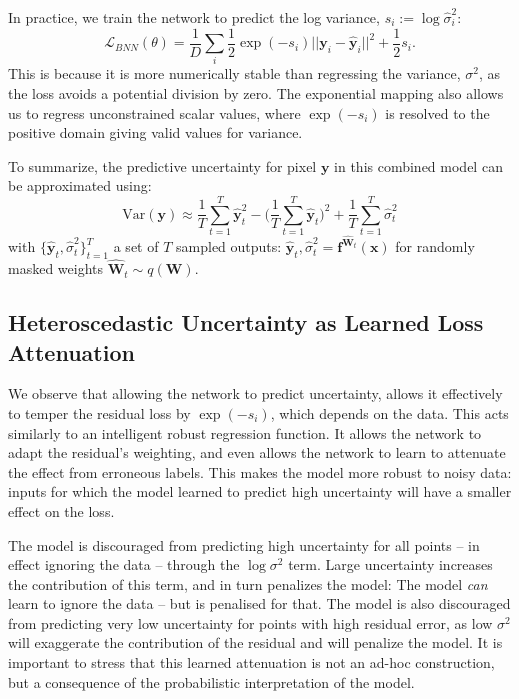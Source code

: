 \documentclass{article}
\newcommand{\cL}{\mathcal{L}}
\newcommand{\f}{\mathbf{f}}
\newcommand{\x}{\mathbf{x}}
\newcommand{\y}{\mathbf{y}}
\newcommand{\W}{\mathbf{W}}
\newcommand{\Wh}{{\widehat{\mathbf{W}}}}
\begin{document}
In practice, we train the network to predict the log variance, $s_i := \log \hat{\sigma}_i^2$: 
\begin{equation}
\cL_{BNN}(\theta) = \frac{1}{D} \sum_i \frac{1}{2} \exp (-s_i) ||\y_i-\hat{\y}_i||^2 + \frac{1}{2} s_i.
\label{eqn:aleatoric_regression_loss}
\end{equation}
This is because it is more numerically stable than regressing the variance, $\sigma^2$, as the loss avoids a potential division by zero. The exponential mapping also allows us to regress unconstrained scalar values, where $\exp(-s_i)$ is resolved to the positive domain giving valid values for variance.

To summarize, the predictive uncertainty for pixel $\y$ in this combined model can be approximated using:
\begin{equation}
\text{Var}(\y) \approx \frac{1}{T} \sum_{t=1}^T \hat{\y}_{t}^2
- \bigg( \frac{1}{T} \sum_{t=1}^T \hat{\y}_{t} \bigg)^2 + \frac{1}{T} \sum_{t=1}^T \hat{\sigma}_{t}^2
\end{equation}
with $\{ \hat{\y}_{t}, \hat{\sigma}_{t}^2 \}_{t=1}^T$ a set of $T$ sampled outputs: $\hat{\y}_{t}, \hat{\sigma}_{t}^2 = \f^{\Wh_t}(\x)$ for randomly masked weights $\Wh_t \sim q(\W)$.


\subsection{Heteroscedastic Uncertainty as Learned Loss Attenuation}

We observe that allowing the network to predict uncertainty, allows it effectively to temper the residual loss by $\exp(-s_i)$, which depends on the data. This acts similarly to an intelligent robust regression function. It allows the network to adapt the residual's weighting, and even allows the network to learn to attenuate the effect from erroneous labels. This makes the model more robust to noisy data: inputs for which the model learned to predict high uncertainty will have a smaller effect on the loss.

The model is discouraged from predicting high uncertainty for all points -- in effect ignoring the data -- through the $\log \sigma^2$ term. Large uncertainty increases the contribution of this term, and in turn penalizes the model: The model \textit{can} learn to ignore the data -- but is penalised for that. The model is also discouraged from predicting very low uncertainty for points with high residual error, as low $\sigma^2$ will exaggerate the contribution of the residual and will penalize the model. It is important to stress that this learned attenuation is not an ad-hoc construction, but a consequence of the probabilistic interpretation of the model. 
\end{document}
